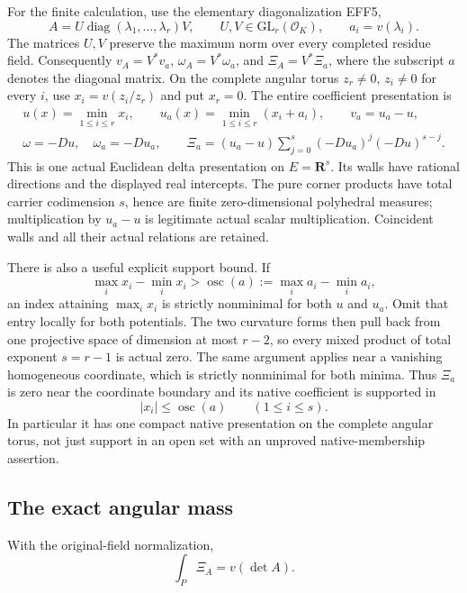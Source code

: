For the finite calculation, use the elementary diagonalization
EFF5,
\[
 A=U\operatorname{diag}(\lambda_1,\ldots,\lambda_r)V,
 \qquad U,V\in\mathrm{GL}_r(\mathcal O_K),\qquad
 a_i=v(\lambda_i).
 \tag{AAT3}
\]
The matrices $U,V$ preserve the maximum norm over every
completed residue field.  Consequently
$v_A=V^*v_a$, $\omega_A=V^*\omega_a$, and
$\Xi_A=V^*\Xi_a$, where the subscript $a$ denotes the
diagonal matrix.  On the complete angular torus $z_r\ne0$,
$z_i\ne0$ for every $i$, use $x_i=v(z_i/z_r)$ and put
$x_r=0$.  The entire coefficient presentation is
\[
 \begin{gathered}
 u(x)=\min_{1\le i\le r}x_i,\qquad
 u_a(x)=\min_{1\le i\le r}(x_i+a_i),\qquad v_a=u_a-u,\\
 \omega=-Du,\quad\omega_a=-Du_a,\qquad
 \Xi_a=(u_a-u)\sum_{j=0}^{s}(-Du_a)^j(-Du)^{s-j}.
 \end{gathered}
 \tag{AAT4}
\]
This is one actual Euclidean delta presentation on
$E=\mathbf R^{s}$.  Its walls have rational directions
and the displayed real intercepts.  The pure corner
products have total carrier codimension $s$, hence are
finite zero-dimensional polyhedral measures; multiplication
by $u_a-u$ is legitimate actual scalar multiplication.
Coincident walls and all their actual relations are retained.

There is also a useful explicit support bound.  If
\[
 \max_i x_i-\min_i x_i>\operatorname{osc}(a)
                         :=\max_i a_i-\min_i a_i,
 \tag{AAT5}
\]
an index attaining $\max_i x_i$ is strictly nonminimal
for both $u$ and $u_a$.  Omit that entry locally for both
potentials.  The two curvature forms then pull back from
one projective space of dimension at most $r-2$, so every
mixed product of total exponent $s=r-1$ is actual zero.
The same argument applies near a vanishing homogeneous
coordinate, which is strictly nonminimal for both minima.
Thus $\Xi_a$ is zero near the coordinate boundary and its
native coefficient is supported in
\[
                         |x_i|\le\operatorname{osc}(a)
                               \qquad(1\le i\le s).
 \tag{AAT6}
\]
In particular it has one compact native presentation on
the complete angular torus, not just support in an open
set with an unproved native-membership assertion.

\subsection{The exact angular mass}

\begin{lemma}
\label{lem:r9-angular-determinant-mass}
With the original-field normalization,
\[
                       \int_P\Xi_A=v(\det A).
 \tag{AAT7}
\]
\end{lemma}

